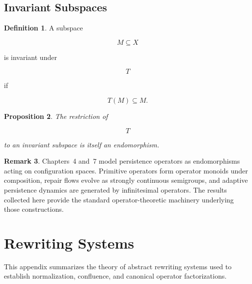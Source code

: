 \documentclass[11pt]{book}
\numberwithin{equation}{chapter}
\theoremstyle{definition}
\newtheorem{definition}{Definition}[chapter]
\newtheorem{remark}[definition]{Remark}
\theoremstyle{plain}
\newtheorem{proposition}[definition]{Proposition}
\begin{document}

\section{Invariant Subspaces}

\begin{definition}

A subspace

\[
M\subseteq X
\]

is invariant under

\[
T
\]

if

\[
T(M)
\subseteq
M.
\]

\end{definition}


\begin{proposition}

The restriction of

\[
T
\]

to an invariant subspace is itself an endomorphism.

\end{proposition}


\begin{remark}

Chapters~4 and~7 model persistence operators as endomorphisms acting on
configuration spaces. Primitive operators form operator monoids under
composition, repair flows evolve as strongly continuous semigroups, and
adaptive persistence dynamics are generated by infinitesimal operators.
The results collected here provide the standard operator-theoretic
machinery underlying those constructions.

\end{remark}

\chapter{Rewriting Systems}

This appendix summarizes the theory of abstract rewriting systems used
to establish normalization, confluence, and canonical operator
factorizations.

\end{document}
